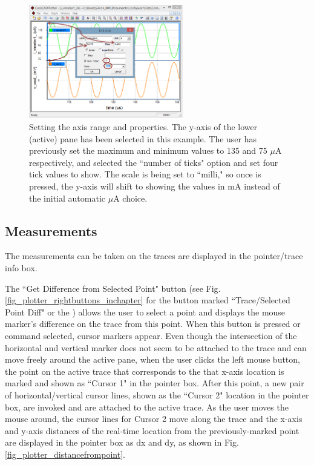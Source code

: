 \begin{figure}
    \includegraphics[width=0.6\textwidth]{./figures/plotter_netlist_editor_figures/Plotter_AxisProperties.png}
    \caption{{Setting the axis range and properties.  The y-axis of the lower (active) pane has been selected in this example.  The user has previously set the maximum and minimum values to 135 and 75 $\mu$A respectively, and selected the ``number of ticks" option and set four tick values to show.  The scale is being set to ``milli," so once  is pressed, the y-axis will shift to showing the values in mA instead of the initial automatic $\mu$A choice.}}
  \label{fig_plotter_axisproperties}
\end{figure}


\subsection{Measurements}
\label{subsec_pane_measurements}

The measurements can be taken on the traces are displayed in the pointer/trace info box.  

The ``\textsf{Get Difference from Selected Point}" button (see Fig. \ref{fig_plotter_rightbuttons_inchapter} for the button marked ``Trace/Selected Point Diff" or the ) allows the user to select a point and displays the mouse marker's difference on the trace from this point.  When this button is pressed or command selected, cursor markers appear.  Even though the intersection of the horizontal and vertical marker does not seem to be attached to the trace and can move freely around the active pane, when the user clicks the left mouse button, the point on the active trace that corresponds to the that x-axis location is marked and shown as ``\textsf{Cursor 1}" in the pointer box. After this point, a new pair of horizontal/vertical cursor lines, shown as the ``\textsf{Cursor 2}" location in the pointer box, are invoked and are attached to the active trace.  As the user moves the mouse around, the cursor lines for Cursor 2 move along the trace and the x-axis and y-axis distances of the real-time location from the previously-marked point are displayed in the pointer box as \textsf{dx} and \textsf{dy}, as shown in Fig. \ref{fig_plotter_distancefrompoint}.  

